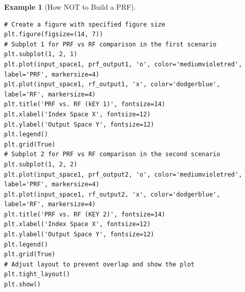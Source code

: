 \documentclass[12pt,openany]{book}
\theoremstyle{definition}
\newtheorem{example}{Example}[chapter]
\begin{document}
\begin{example}[How NOT to Build a PRF]
\begin{lstlisting}[style=sage]
# Create a figure with specified figure size
plt.figure(figsize=(14, 7))
# Subplot 1 for PRF vs RF comparison in the first scenario
plt.subplot(1, 2, 1)
plt.plot(input_space1, prf_output1, 'o', color='mediumvioletred', label='PRF', markersize=4)
plt.plot(input_space1, rf_output1, 'x', color='dodgerblue', label='RF', markersize=4)
plt.title('PRF vs. RF (kEY 1)', fontsize=14)
plt.xlabel('Index Space X', fontsize=12)
plt.ylabel('Output Space Y', fontsize=12)
plt.legend()
plt.grid(True)
# Subplot 2 for PRF vs RF comparison in the second scenario
plt.subplot(1, 2, 2)
plt.plot(input_space1, prf_output2, 'o', color='mediumvioletred', label='PRF', markersize=4)
plt.plot(input_space1, rf_output2, 'x', color='dodgerblue', label='RF', markersize=4)
plt.title('PRF vs. RF (KEY 2)', fontsize=14)
plt.xlabel('Index Space X', fontsize=12)
plt.ylabel('Output Space Y', fontsize=12)
plt.legend()
plt.grid(True)
# Adjust layout to prevent overlap and show the plot
plt.tight_layout()
plt.show()
	\end{lstlisting}
\end{example}
\end{document}
